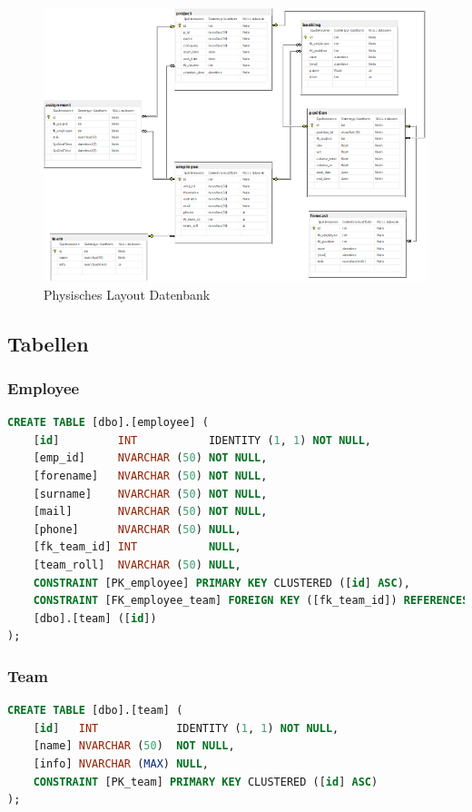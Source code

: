 \documentclass{article}
\begin{document}
    \begin{figure}[h]
        \centering
        \includegraphics[width= \textwidth]{images/datenbankphysisches-Layout.png}
        \caption{Physisches Layout Datenbank}
        \label{fig:beispiel}
    \end{figure}

\newpage

    \subsection{Tabellen}

        \subsubsection{Employee}
        \begin{lstlisting}[language=Sql, caption= Create Table Statement für Employee Table]
    CREATE TABLE [dbo].[employee] (
    [id]         INT           IDENTITY (1, 1) NOT NULL,
    [emp_id]     NVARCHAR (50) NOT NULL,
    [forename]   NVARCHAR (50) NOT NULL,
    [surname]    NVARCHAR (50) NOT NULL,
    [mail]       NVARCHAR (50) NOT NULL,
    [phone]      NVARCHAR (50) NULL,
    [fk_team_id] INT           NULL,
    [team_roll]  NVARCHAR (50) NULL,
    CONSTRAINT [PK_employee] PRIMARY KEY CLUSTERED ([id] ASC),
    CONSTRAINT [FK_employee_team] FOREIGN KEY ([fk_team_id]) REFERENCES 
    [dbo].[team] ([id])
);
        \end{lstlisting}
        \subsubsection{Team}
         \begin{lstlisting}[language=Sql, caption= Create Table Statement für Team Table]
    CREATE TABLE [dbo].[team] (
    [id]   INT            IDENTITY (1, 1) NOT NULL,
    [name] NVARCHAR (50)  NOT NULL,
    [info] NVARCHAR (MAX) NULL,
    CONSTRAINT [PK_team] PRIMARY KEY CLUSTERED ([id] ASC)
);

         \end{lstlisting}
\end{document}
